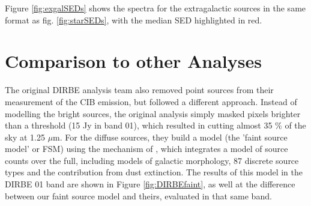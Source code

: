 \documentclass{aa}
\begin{document}
Figure \ref{fig:exgalSEDs} shows the spectra for the extragalactic sources in the same format as fig. \ref{fig:starSEDs}, with the median SED highlighted in red. 

\section{Comparison to other Analyses}
\label{sec:consistency}

The original DIRBE analysis team \citep{dirbeFaint} also removed point sources from their measurement of the CIB emission, but followed a different approach. Instead of modelling the bright sources, the original analysis simply masked pixels brighter than a threshold (15 Jy in band 01), which resulted in cutting almost 35 \% of the sky at 1.25 $\mu$m. For the diffuse sources, they build a model (the 'faint source model' or FSM) using the mechanism of \cite{wainscoat}, which integrates a model of source counts over the full, including models of galactic morphology, 87 discrete source types and the contribution from dust extinction. The results of this model in the DIRBE 01 band are shown in Figure \ref{fig:DIRBEfaint}, as well at the difference between our faint source model and theirs, evaluated in that same band. 
\end{document}
